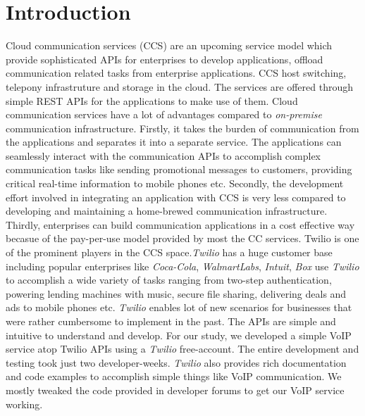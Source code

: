 \section{Introduction}
\label{sec-intro}
Cloud communication services (CCS) are an upcoming service model which provide sophisticated APIs for enterprises to develop applications, offload communication related tasks from enterprise applications. CCS host switching, telepony infrastruture and storage in the cloud. The services are offered through simple REST APIs for the applications to make use of them. Cloud communication services have a lot of advantages compared to \textit{on-premise} communication infrastructure. Firstly, it takes the burden of communication from the applications and separates it into a separate service. The applications can seamlessly interact with the communication APIs to accomplish complex communication tasks like sending promotional messages to customers, providing critical real-time information to mobile phones etc. Secondly, the development effort involved in integrating an application with CCS is very less compared to developing and maintaining a home-brewed communication infrastructure.
Thirdly, enterprises can build communication applications in a cost effective way becasue of the pay-per-use model provided by most the CC services. {Twilio} is one of the prominent players in the CCS space.\textit{Twilio} has a huge customer base  including popular enterprises like \textit{Coca-Cola}, \textit{WalmartLabs}, \textit{Intuit}, \textit{Box} use \textit{Twilio} to accomplish a wide variety of tasks ranging from two-step authentication, powering lending machines with music, secure file sharing, delivering deals and ads to mobile phones etc. \textit{Twilio} enables lot of new scenarios for businesses that were rather cumbersome to implement in the past. The APIs are simple and intuitive to understand and develop. For our study, we developed a simple VoIP service atop Twilio APIs using a \textit{Twilio} free-account. The entire development and testing took just two developer-weeks. \textit{Twilio} also provides rich documentation and code examples to accomplish simple things like VoIP communication. We mostly tweaked the code provided in developer forums to get our VoIP service working.   
